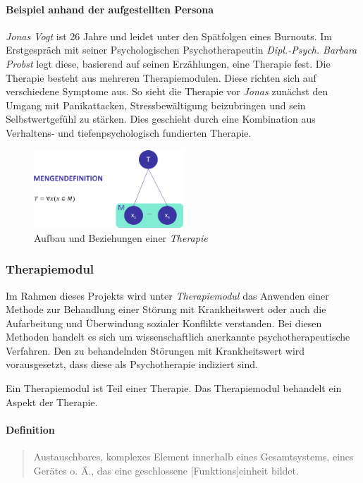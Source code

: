 \paragraph{Beispiel anhand der aufgestellten Persona}
\emph{Jonas Vogt} ist 26 Jahre und leidet unter den Spätfolgen eines Burnouts. Im Erstgespräch mit seiner Psychologischen Psychotherapeutin \emph{Dipl.-Psych. Barbara Probst} legt diese, basierend auf seinen Erzählungen, eine Therapie fest. Die Therapie besteht aus  mehreren Therapiemodulen. Diese richten sich auf verschiedene Symptome aus. So sieht die Therapie vor \emph{Jonas} zunächst den Umgang mit Panikattacken, Stressbewältigung beizubringen und sein Selbstwertgefühl zu stärken. Dies geschieht durch eine Kombination aus Verhaltens- und tiefenpsychologisch fundierten Therapie.

\begin{figure}[h]
\centering
\includegraphics[width=0.5\textwidth]{pictures/therapiedef}
\caption{Aufbau und Beziehungen einer \emph{Therapie}}
\label{therapiedef}
\end{figure}


\subsubsection{Therapiemodul}
Im Rahmen dieses Projekts wird unter \emph{Therapiemodul} das Anwenden  einer Methode zur Behandlung einer Störung mit Krankheitswert oder auch die Aufarbeitung und Überwindung sozialer Konflikte verstanden. Bei diesen Methoden handelt es sich um wissenschaftlich anerkannte psychotherapeutische Verfahren. Den zu behandelnden Störungen mit Krankheitswert wird vorausgesetzt, dass diese als Psychotherapie indiziert sind.

Ein Therapiemodul ist Teil einer Therapie. Das Therapiemodul behandelt ein Aspekt der Therapie.

\paragraph{Definition}
\begin{quote}
Austauschbares, komplexes Element innerhalb eines Gesamtsystems, eines Gerätes o. Ä., das eine geschlossene [Funktions]einheit bildet. \cite{DudenMod70:online}
\end{quote}

